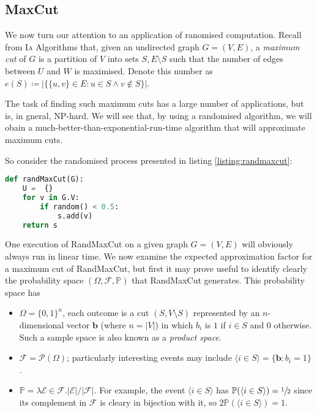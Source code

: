 	\subsection{MaxCut}
		We now turn our attention to an application of ranomised computation. Recall from \textsc{Ia} Algorithms that, given an 
		undirected graph $G = (V, E)$, a \emph{maximum cut} of $G$ is a partition of $V$ into sets $S, E\setminus S$ such that the number of edges
		between $U$ and $W$ is maximised. Denote this number as $e(S) \coloneqq | \{\{u,v\} \in E : u \in S \land v \notin S\} |$. \par
		The task of finding such maximum cuts has a large number of applications, but is, in gneral, NP-hard. We will see that, by using
		a randomised algorithm, we will obain a much-better-than-exponential-run-time algorithm that will approximate maximum cuts. \par

		So consider the randomised process presented in listing \ref{listing:randmaxcut}:
\begin{lstlisting}[caption={Algorithm RandMaxCut},label=listing:randmaxcut,language=python,style=mystyle]
def randMaxCut(G):
	U =  {}
	for v in G.V:
		if random() < 0.5:
			s.add(v)
	return s
\end{lstlisting}
		One execution of RandMaxCut on a given graph $G = (V,E)$ will obviously always run in linear time. We now examine the expected
		approximation factor for a maximum cut of RandMaxCut, but first it may prove useful to identify clearly the probability space
		$(\Omega, \mathcal{F}, \mathbb{P})$ that RandMaxCut generates. This probability space has
		\begin{itemize}
			\item $\Omega = \{0,1\}^n$, each outcome is a cut $(S, V \setminus S)$ represented by an $n$-dimensional vector 
			$\mathbf{b}$ (where $n = |V|$) in which $b_i$ is $1$ if $i \in S$ and $0$ otherwise. Such a sample space is also 
			known as a \emph{product space}.
			\item $\mathcal{F} = \mathcal{P}(\Omega)$; particularly interesting events may include 
			$\langle i \in S \rangle = \{\mathbf{b} : b_i = 1\}$.
			\item $\mathbb{P} = \lambda \mathcal{E} \in \mathcal{F}. | \mathcal{E} | / | \mathcal{F} |$. For example, the event 
			$\langle i \in S \rangle$ has $\mathbb{P}(\langle i \in S \rangle) = \sfrac{1}{2}$ since its complement in 
			$\mathcal{F}$ is cleary in bijection with it, so $2 \mathbb{P}(\langle i \in S \rangle) = 1$.
		\end{itemize}
		
